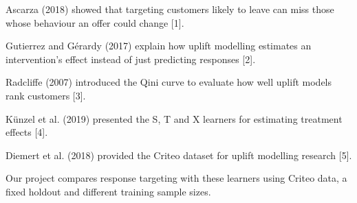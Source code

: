 Ascarza (2018) showed that targeting customers likely to leave can miss those whose behaviour an offer could change [1].

Gutierrez and Gérardy (2017) explain how uplift modelling estimates an intervention's effect instead of just predicting responses [2].

Radcliffe (2007) introduced the Qini curve to evaluate how well uplift models rank customers [3].

Künzel et al. (2019) presented the S, T and X learners for estimating treatment effects [4].

Diemert et al. (2018) provided the Criteo dataset for uplift modelling research [5].

Our project compares response targeting with these learners using Criteo data, a fixed holdout and different training sample sizes.
